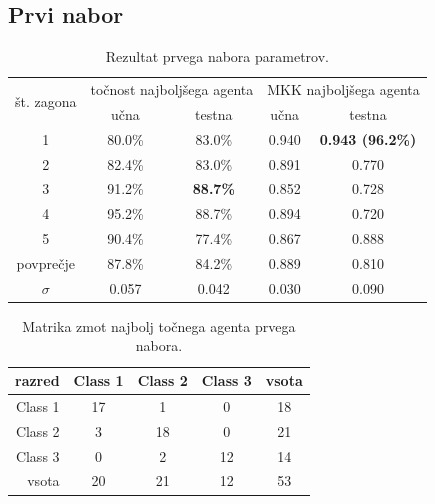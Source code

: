 \subsection{Prvi nabor}\label{subsec:dodatek-wine-prvi-nabor}
\begin{table}[H]
    \begin{center}
        \begin{tabular}{|| c | c c || c c ||}
            \hline
            \multirow{2}{*}{št. zagona} & \multicolumn{2}{c||}{točnost najboljšega agenta} & \multicolumn{2}{c||}{MKK najboljšega agenta} \\ \cline{2-5}
            & učna   & testna          & učna  & testna                  \\
            \hline
            1         & 80.0\% & 83.0\%          & 0.940 & \textbf{0.943 (96.2\%)} \\
            \hline
            2         & 82.4\% & 83.0\%          & 0.891 & 0.770                   \\
            \hline
            3         & 91.2\% & \textbf{88.7\%} & 0.852 & 0.728                   \\
            \hline
            4         & 95.2\% & 88.7\%          & 0.894 & 0.720                   \\
            \hline
            5         & 90.4\% & 77.4\%          & 0.867 & 0.888                   \\
            \hline
            povprečje & 87.8\% & 84.2\%          & 0.889 & 0.810                   \\
            \hline
            $\sigma$  & 0.057  & 0.042           & 0.030 & 0.090                   \\
            \hline
        \end{tabular}
    \end{center}
    \caption{Rezultat prvega nabora parametrov.}
    \label{tab:wine_result_1}
\end{table}

\begin{table}[H]
    \centering
    \begin{tabular}{||rcccc||}
        \hline
        razred  & Class 1 & Class 2 & Class 3 & vsota \\ \hline
        Class 1 & 17      & 1       & 0       & 18    \\ \hline
        Class 2 & 3       & 18      & 0       & 21    \\ \hline
        Class 3 & 0       & 2       & 12      & 14    \\ \hline
        vsota   & 20      & 21      & 12      & 53    \\ \hline
    \end{tabular}
    \caption{Matrika zmot najbolj točnega agenta prvega nabora.}
    \label{tab:wine_acc_1}
\end{table}

